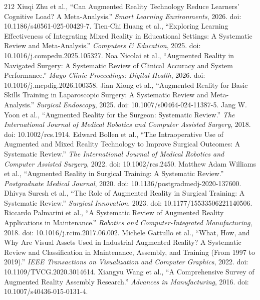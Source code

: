\begin{thebibliography}{212}
 Xiuqi Zhu et al., ``Can Augmented Reality Technology Reduce Learners' Cognitive Load? A Meta-Analysis.'' \emph{Smart Learning Environments}, 2026. doi: 10.1186/s40561-025-00429-7.
 Tien-Chi Huang et al., ``Exploring Learning Effectiveness of Integrating Mixed Reality in Educational Settings: A Systematic Review and Meta-Analysis.'' \emph{Computers \& Education}, 2025. doi: 10.1016/j.compedu.2025.105327.
 Noa Nicolai et al., ``Augmented Reality in Navigated Surgery: A Systematic Review of Clinical Accuracy and System Performance.'' \emph{Mayo Clinic Proceedings: Digital Health}, 2026. doi: 10.1016/j.mcpdig.2026.100358.
 Jian Xiong et al., ``Augmented Reality for Basic Skills Training in Laparoscopic Surgery: A Systematic Review and Meta-Analysis.'' \emph{Surgical Endoscopy}, 2025. doi: 10.1007/s00464-024-11387-5.
 Jang W. Yoon et al., ``Augmented Reality for the Surgeon: Systematic Review.'' \emph{The International Journal of Medical Robotics and Computer Assisted Surgery}, 2018. doi: 10.1002/rcs.1914.
 Edward Bollen et al., ``The Intraoperative Use of Augmented and Mixed Reality Technology to Improve Surgical Outcomes: A Systematic Review.'' \emph{The International Journal of Medical Robotics and Computer Assisted Surgery}, 2022. doi: 10.1002/rcs.2450.
 Matthew Adam Williams et al., ``Augmented Reality in Surgical Training: A Systematic Review.'' \emph{Postgraduate Medical Journal}, 2020. doi: 10.1136/postgradmedj-2020-137600.
 Dhivya Suresh et al., ``The Role of Augmented Reality in Surgical Training: A Systematic Review.'' \emph{Surgical Innovation}, 2023. doi: 10.1177/15533506221140506.
 Riccardo Palmarini et al., ``A Systematic Review of Augmented Reality Applications in Maintenance.'' \emph{Robotics and Computer-Integrated Manufacturing}, 2018. doi: 10.1016/j.rcim.2017.06.002.
 Michele Gattullo et al., ``What, How, and Why Are Visual Assets Used in Industrial Augmented Reality? A Systematic Review and Classification in Maintenance, Assembly, and Training (From 1997 to 2019).'' \emph{IEEE Transactions on Visualization and Computer Graphics}, 2022. doi: 10.1109/TVCG.2020.3014614.
 Xiangyu Wang et al., ``A Comprehensive Survey of Augmented Reality Assembly Research.'' \emph{Advances in Manufacturing}, 2016. doi: 10.1007/s40436-015-0131-4.

\end{thebibliography}
